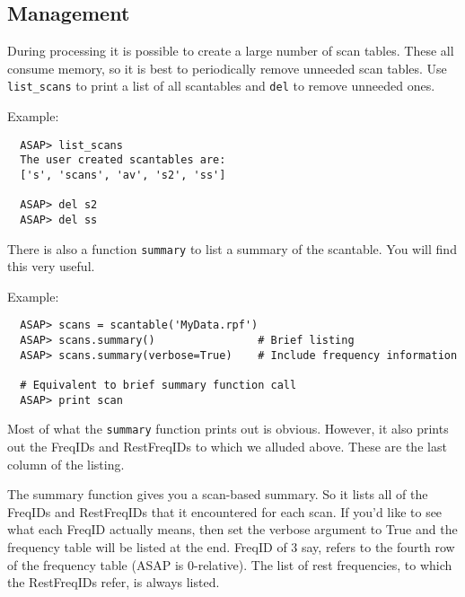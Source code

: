\documentclass[11pt]{article}
\newcommand{\cmd}[1]{{\tt #1}}
\begin{document}
\subsection{Management}

During processing it is possible to create a large number of scan
tables. These all consume memory, so it is best to periodically remove
unneeded scan tables. Use \cmd{list\_scans} to print a list of all
scantables and \cmd{del} to remove unneeded ones.

Example:

\begin{verbatim}
  ASAP> list_scans
  The user created scantables are:
  ['s', 'scans', 'av', 's2', 'ss']

  ASAP> del s2
  ASAP> del ss
\end{verbatim}

There is also a function \cmd{summary} to list a summary of the scantable.
You will find this very useful.

Example:

\begin{verbatim}
  ASAP> scans = scantable('MyData.rpf')
  ASAP> scans.summary()                # Brief listing
  ASAP> scans.summary(verbose=True)    # Include frequency information

  # Equivalent to brief summary function call
  ASAP> print scan
\end{verbatim}

Most of what the \cmd{summary} function  prints out is obvious. However,
it also prints out the FreqIDs and RestFreqIDs to which we alluded above.
These are the last column of the listing.

The summary function gives you a scan-based summary.  So it lists all of
the FreqIDs and RestFreqIDs that it encountered for each scan.  If you'd
like to see what each FreqID actually means, then set the verbose
argument to True and the frequency table will be listed at the end.
FreqID of 3 say, refers to the fourth row of the frequency table (ASAP
is 0-relative). The list of rest frequencies, to which the RestFreqIDs
refer, is always listed.



\end{document}
